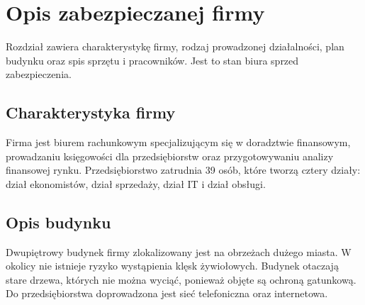 \newpage\section{Opis zabezpieczanej firmy}
Rozdział zawiera charakterystykę firmy, rodzaj prowadzonej działalności, plan budynku oraz spis sprzętu i pracowników. Jest to stan biura sprzed zabezpieczenia.

\subsection{Charakterystyka firmy}
Firma jest biurem rachunkowym specjalizującym się w doradztwie \linebreak finansowym, prowadzaniu księgowości dla przedsiębiorstw oraz przygotowywaniu analizy finansowej rynku. Przedsiębiorstwo zatrudnia 39 osób, które tworzą cztery działy: dział ekonomistów, dział sprzedaży, dział IT i dział obsługi.

\subsection{Opis budynku}
Dwupiętrowy budynek firmy zlokalizowany jest na obrzeżach dużego miasta. W okolicy nie istnieje ryzyko wystąpienia klęsk żywiołowych. \linebreak Budynek otaczają stare drzewa, których nie można wyciąć, ponieważ \linebreak objęte są ochroną gatunkową. Do przedsiębiorstwa doprowadzona jest sieć \linebreak telefoniczna oraz internetowa.


